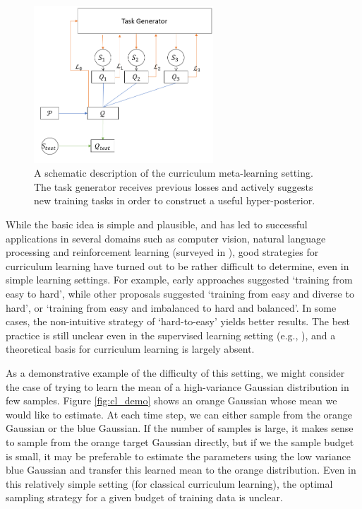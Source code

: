 \documentclass{article}
\theoremstyle{definition}
\begin{document}
\begin{figure}[t]
	\centering
	\includegraphics[width=0.6\textwidth]{setup_cl.PNG}
	\caption{A schematic description of the curriculum meta-learning setting. The task generator receives previous losses and actively suggests new training tasks in order to construct a useful hyper-posterior.}
	\label{fig:cl-setting}
\end{figure}

While the basic idea is simple and plausible, and has led to successful applications in several domains such as computer vision, natural language processing and reinforcement learning (surveyed in \citep{Narvekar2019,Soviany2021}), good strategies for curriculum learning have turned out to be rather difficult to determine, even in simple learning settings.
For example, early approaches suggested `training from easy to hard', while other proposals suggested `training from easy and diverse to hard', or `training from easy and imbalanced to hard and balanced'. In some cases, the non-intuitive strategy of `hard-to-easy' yields better results. The best practice is still unclear even in the supervised learning setting (e.g., \cite{Anonymous2021}), and a theoretical basis for curriculum learning is largely absent.

As a demonstrative example of the difficulty of this setting, we might consider the case of trying to learn the mean of a high-variance Gaussian distribution in few samples. Figure \ref{fig:cl_demo} shows an orange Gaussian whose mean we would like to estimate. At each time step, we can either sample from the orange Gaussian or the blue Gaussian. If the number of samples is large, it makes sense to sample from the orange target Gaussian directly, but if we the sample budget is small, it may be preferable to estimate the parameters using the low variance blue Gaussian and transfer this learned mean to the orange distribution. Even in this relatively simple setting (for classical curriculum learning), the optimal sampling strategy for a given budget of training data is unclear.
\end{document}
